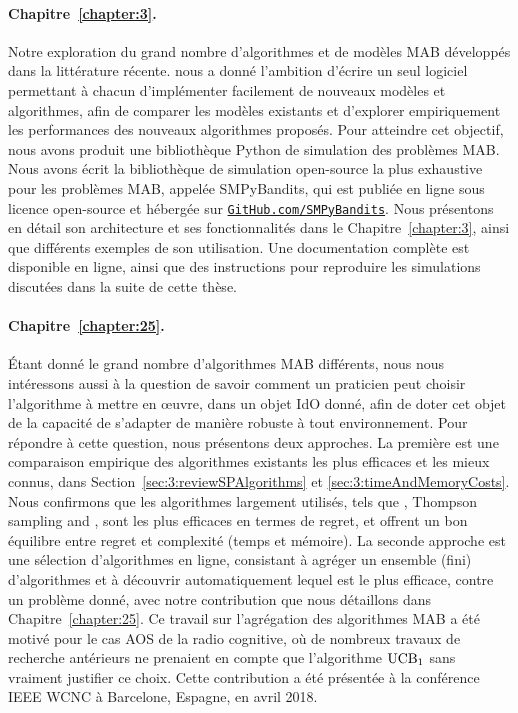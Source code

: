\begin{resume_fr}
\paragraph{Chapitre~\ref{chapter:3}.}
%
Notre exploration du grand nombre d'algorithmes et de modèles MAB développés dans la littérature récente.
nous a donné l'ambition d'écrire un seul logiciel permettant à chacun d'implémenter facilement de nouveaux modèles et algorithmes, afin de comparer les modèles existants et d'explorer empiriquement les performances des nouveaux algorithmes proposés.
Pour atteindre cet objectif, nous avons produit une bibliothèque Python de simulation des problèmes MAB.
%
Nous avons écrit la bibliothèque de simulation open-source la plus exhaustive pour les problèmes MAB, appelée SMPyBandits, qui est publiée en ligne sous licence open-source \cite{SMPyBanditsJMLR,SMPyBandits} et hébergée sur \href{https://GitHub.com/SMPyBandits}{\texttt{GitHub.com/SMPyBandits}}.
Nous présentons en détail son architecture et ses fonctionnalités dans le Chapitre~\ref{chapter:3}, ainsi que différents exemples de son utilisation.
Une documentation complète est disponible en ligne, ainsi que des instructions pour reproduire les simulations discutées dans la suite de cette thèse.


\paragraph{Chapitre~\ref{chapter:25}.}
%
Étant donné le grand nombre d'algorithmes MAB différents, nous nous intéressons aussi à la question de savoir comment un praticien peut choisir l'algorithme à mettre en œuvre, dans un objet IdO donné, afin de doter cet objet de la capacité de s'adapter de manière robuste à tout environnement.
Pour répondre à cette question, nous présentons deux approches.
La première est une comparaison empirique des algorithmes existants les plus efficaces et les mieux connus, dans Section~\ref{sec:3:reviewSPAlgorithms} et \ref{sec:3:timeAndMemoryCosts}.
Nous confirmons que les algorithmes largement utilisés, tels que \UCB{} \cite{Auer02}, Thompson sampling \cite{Thompson33} and \klUCB{} \cite{KLUCBJournal}, sont les plus efficaces en termes de regret, et offrent un bon équilibre entre regret et complexité (temps et mémoire).
La seconde approche est une sélection d'algorithmes en ligne, consistant à agréger un ensemble (fini) d'algorithmes et à découvrir automatiquement lequel est le plus efficace, contre un problème donné, avec notre contribution \Aggr{} que nous détaillons dans Chapitre~\ref{chapter:25}.
Ce travail sur l'agrégation des algorithmes MAB a été motivé pour le cas AOS de la radio cognitive, où de nombreux travaux de recherche antérieurs ne prenaient en compte que l'algorithme $\mathrm{UCB}_1$ sans vraiment justifier ce choix.
Cette contribution a été présentée à la conférence IEEE WCNC à Barcelone, Espagne, en avril 2018.



\end{resume_fr}
